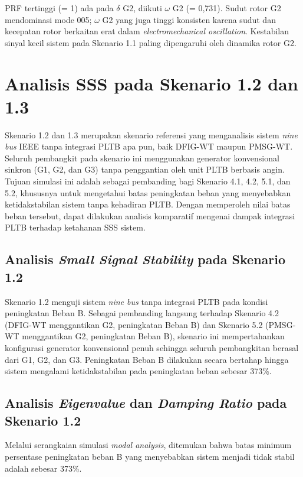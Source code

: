 PRF tertinggi (= 1) ada pada $\delta$ G2, diikuti $\omega$ G2 (= 0,731).
Sudut rotor G2 mendominasi mode 005; $\omega$ G2 yang juga tinggi konsisten
karena sudut dan kecepatan rotor berkaitan erat dalam
\textit{electromechanical oscillation}. Kestabilan sinyal kecil sistem pada
Skenario 1.1 paling dipengaruhi oleh dinamika rotor G2.

\section{Analisis SSS pada Skenario 1.2 dan 1.3}
\label{sec:sss_skenario12_13}

Skenario 1.2 dan 1.3 merupakan skenario referensi yang menganalisis sistem
\textit{nine bus} IEEE tanpa integrasi PLTB apa pun, baik DFIG-WT maupun
PMSG-WT. Seluruh pembangkit pada skenario ini menggunakan generator konvensional
sinkron (G1, G2, dan G3) tanpa penggantian oleh unit PLTB berbasis angin. Tujuan
simulasi ini adalah sebagai pembanding bagi Skenario 4.1, 4.2, 5.1, dan 5.2,
khususnya untuk mengetahui batas peningkatan beban yang menyebabkan
ketidakstabilan sistem tanpa kehadiran PLTB. Dengan memperoleh nilai batas beban
tersebut, dapat dilakukan analisis komparatif mengenai dampak integrasi PLTB
terhadap ketahanan SSS sistem.

\subsection{Analisis \textit{Small Signal Stability} pada Skenario 1.2}
\label{subsec:sss_sk12}

Skenario 1.2 menguji sistem \textit{nine bus} tanpa integrasi PLTB pada kondisi
peningkatan Beban B. Sebagai pembanding langsung terhadap Skenario 4.2 (DFIG-WT
menggantikan G2, peningkatan Beban B) dan Skenario 5.2 (PMSG-WT menggantikan G2, peningkatan Beban B), skenario ini mempertahankan konfigurasi generator
konvensional penuh sehingga seluruh pembangkitan berasal dari G1, G2, dan G3.
Peningkatan Beban B dilakukan secara bertahap hingga sistem mengalami
ketidakstabilan pada peningkatan beban sebesar 373\%.

\subsection{Analisis \textit{Eigenvalue} dan \textit{Damping Ratio} pada
Skenario 1.2}
\label{subsec:eigenvalue_sk12}

Melalui serangkaian simulasi \textit{modal analysis}, ditemukan bahwa batas
minimum persentase peningkatan beban B yang menyebabkan sistem menjadi tidak
stabil adalah sebesar 373\%.

